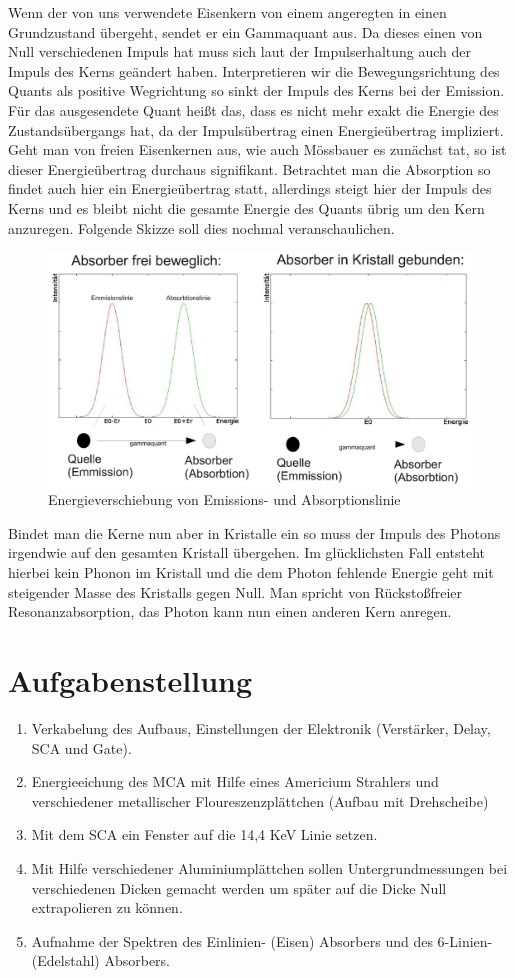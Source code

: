 \documentclass[12pt]{article}
\begin{document}
Wenn der von uns verwendete Eisenkern von einem angeregten in einen Grundzustand übergeht, sendet er ein Gammaquant aus. Da dieses einen von Null verschiedenen 
Impuls hat muss sich laut der Impulserhaltung auch der Impuls des Kerns geändert haben. Interpretieren wir die Bewegungsrichtung des Quants als positive
Wegrichtung so sinkt der Impuls des Kerns bei der Emission. Für das ausgesendete Quant heißt das, dass es nicht mehr exakt die Energie des Zustandsübergangs
hat, da der Impulsübertrag einen Energieübertrag impliziert. Geht man von freien Eisenkernen aus, wie auch Mössbauer es zunächst tat, so ist dieser Energieübertrag
durchaus signifikant. Betrachtet man die Absorption so findet auch hier ein Energieübertrag statt, allerdings steigt hier der Impuls des Kerns und es bleibt
nicht die gesamte Energie des Quants übrig um den Kern anzuregen. Folgende Skizze soll dies nochmal veranschaulichen.
\begin{figure}
 \includegraphics[width=0.9\linewidth]{pictures/linienskizze.ps}
 \caption{Energieverschiebung von Emissions- und Absorptionslinie}
 \label{linienskizze}
\end{figure}


Bindet man die Kerne nun aber in Kristalle ein so muss der Impuls des Photons irgendwie auf den gesamten Kristall übergehen. Im glücklichsten Fall entsteht
hierbei kein Phonon im Kristall und die dem Photon fehlende Energie geht mit steigender Masse des Kristalls gegen Null. Man spricht von Rückstoßfreier
Resonanzabsorption, das Photon kann nun einen anderen Kern anregen.
\section{Aufgabenstellung}
\begin{enumerate}
 \item Verkabelung des Aufbaus, Einstellungen der Elektronik (Verstärker, Delay, SCA und Gate).
 \item Energieeichung des MCA mit Hilfe eines Americium Strahlers und verschiedener metallischer Floureszenzplättchen (Aufbau mit Drehscheibe)
 \item Mit dem SCA ein Fenster auf die 14,4 KeV Linie setzen.
 \item Mit Hilfe verschiedener Aluminiumplättchen sollen Untergrundmessungen bei verschiedenen Dicken gemacht werden um später auf die Dicke Null extrapolieren zu können.
 \item Aufnahme der Spektren des Einlinien- (Eisen) Absorbers und des 6-Linien- (Edelstahl) Absorbers.
\end{enumerate}
\end{document}
